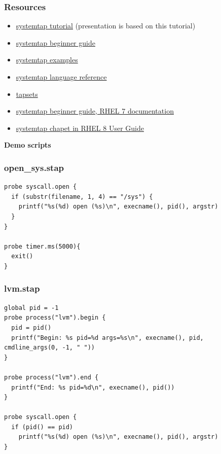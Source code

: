 \documentclass[10pt,utf8]{beamer}
\begin{document}
\begin{frame}
	\frametitle{Resources}
	\begin{itemize}
		\item \color{blue}\href{http://sourceware.org/systemtap/tutorial.pdf}{systemtap tutorial} \color{black}(presentation is based on this tutorial)
		\item \color{blue}\href{https://sourceware.org/systemtap/SystemTap_Beginners_Guide/}{systemtap beginner guide}
		\item \href{https://sourceware.org/systemtap/examples/}{systemtap examples}
		\item \href{https://sourceware.org/systemtap/langref/}{systemtap language reference}
		\item \href{https://sourceware.org/systemtap/tapsets/}{tapsets}
		\item \href{https://access.redhat.com/documentation/en-us/red\_hat\_enterprise_linux/7/html-single/systemtap\_beginners\_guide/index}{systemtap beginner guide, RHEL 7 documentation}
		\item \href{https://access.redhat.com/documentation/en-us/red_hat_developer\_toolset/8/html/user\_guide/chap-systemtap}{systemtap chapet in RHEL 8 User Guide}
	\end{itemize}
\end{frame}

\begin{frame}
	\centering
	\huge{\textbf{Demo scripts}}
\end{frame}

\begin{frame}[fragile]
    \frametitle{open\_sys.stap}
    \begin{lstlisting}[style=Bash]
probe syscall.open {
  if (substr(filename, 1, 4) == "/sys") {
    printf("%s(%d) open (%s)\n", execname(), pid(), argstr)
  }
}

probe timer.ms(5000){
  exit()
}
    \end{lstlisting}
\end{frame}

\begin{frame}[fragile]
    \frametitle{lvm.stap}
    \begin{lstlisting}[style=Bash]
global pid = -1
probe process("lvm").begin {
  pid = pid()
  printf("Begin: %s pid=%d args=%s\n", execname(), pid, cmdline_args(0, -1, " "))
}

probe process("lvm").end {
  printf("End: %s pid=%d\n", execname(), pid())
}

probe syscall.open {
  if (pid() == pid)
    printf("%s(%d) open (%s)\n", execname(), pid(), argstr)
}
    \end{lstlisting}
\end{frame}
\end{document}
